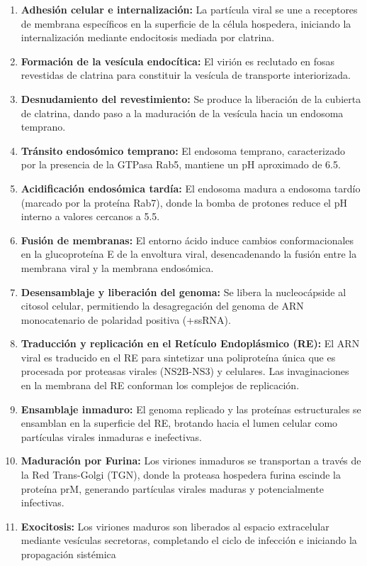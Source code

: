 \begin{enumerate}
    \item \textbf{Adhesión celular e internalización:} La partícula viral se une a receptores de membrana específicos en la superficie de la célula hospedera, iniciando la internalización mediante endocitosis mediada por clatrina.
    \item \textbf{Formación de la vesícula endocítica:} El virión es reclutado en fosas revestidas de clatrina para constituir la vesícula de transporte interiorizada.
    \item \textbf{Desnudamiento del revestimiento:} Se produce la liberación de la cubierta de clatrina, dando paso a la maduración de la vesícula hacia un endosoma temprano.
    \item \textbf{Tránsito endosómico temprano:} El endosoma temprano, caracterizado por la presencia de la GTPasa Rab5, mantiene un pH aproximado de 6.5.
    \item \textbf{Acidificación endosómica tardía:} El endosoma madura a endosoma tardío (marcado por la proteína Rab7), donde la bomba de protones reduce el pH interno a valores cercanos a 5.5.
    \item \textbf{Fusión de membranas:} El entorno ácido induce cambios conformacionales en la glucoproteína E de la envoltura viral, desencadenando la fusión entre la membrana viral y la membrana endosómica.
    \item \textbf{Desensamblaje y liberación del genoma:} Se libera la nucleocápside al citosol celular, permitiendo la desagregación del genoma de ARN monocatenario de polaridad positiva (+ssRNA).
    \item \textbf{Traducción y replicación en el Retículo Endoplásmico (RE):} El ARN viral es traducido en el RE para sintetizar una poliproteína única que es procesada por proteasas virales ($\text{NS2B-NS3}$) y celulares. Las invaginaciones en la membrana del RE conforman los complejos de replicación.
    \item \textbf{Ensamblaje inmaduro:} El genoma replicado y las proteínas estructurales se ensamblan en la superficie del RE, brotando hacia el lumen celular como partículas virales inmaduras e inefectivas.
    \item \textbf{Maduración por Furina:} Los viriones inmaduros se transportan a través de la Red Trans-Golgi (TGN), donde la proteasa hospedera furina escinde la proteína prM, generando partículas virales maduras y potencialmente infectivas.
    \item \textbf{Exocitosis:} Los viriones maduros son liberados al espacio extracelular mediante vesículas secretoras, completando el ciclo de infección e iniciando la propagación sistémica \cite{screaton2015new}
\end{enumerate}

